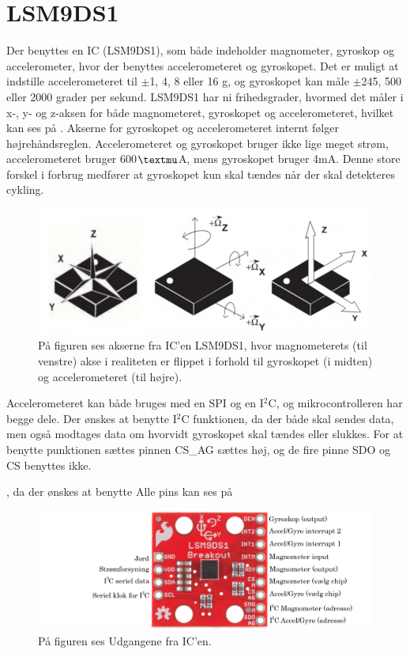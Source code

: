 \section{LSM9DS1}
Der benyttes en IC (LSM9DS1), som både indeholder magnometer, gyroskop og accelerometer, hvor der benyttes accelerometeret og gyroskopet. Det er muligt at indstille accelerometeret til $\pm$1, 4, 8 eller 16 g, og gyroskopet kan måle $\pm$245, 500 eller 2000 grader per sekund.\citep{Jimb02016} \newline
LSM9DS1 har ni frihedsgrader, hvormed det måler i x-, y- og z-aksen for både magnometeret, gyroskopet og accelerometeret, hvilket kan ses på . Akserne for gyroskopet og accelerometeret internt følger højrehåndsreglen.\citep{Jimb02016}\newline
Accelerometeret og gyroskopet bruger ikke lige meget strøm, accelerometeret bruger 600$\textmu$A, mens gyroskopet bruger 4mA. Denne store forskel i forbrug medfører at gyroskopet kun skal tændes når der skal detekteres cykling. 

\begin{figure}[H]
	\centering
	\includegraphics[scale=0.6]{figures/cDesign/LSM9DS1.png}
	\caption{På figuren ses akserne fra IC'en LSM9DS1, hvor magnometerets (til venstre) akse i realiteten er flippet i forhold til gyroskopet (i midten) og accelerometeret (til højre).\citep{Jimb02016}}
	\label{vores_IC}
\end{figure}

Accelerometeret kan både bruges med en SPI og en I$^{2}$C, og mikrocontrolleren har begge dele. Der ønskes at benytte I$^{2}$C funktionen, da der både skal sendes data, men også modtages data om hvorvidt gyroskopet skal tændes eller slukkes. For at benytte punktionen sættes pinnen CS\_AG sættes høj, og de fire pinne SDO og CS benyttes ikke. 

, da der ønskes at benytte  Alle pins kan ses på 

\begin{figure}[H]
	\centering
	\includegraphics[scale=0.35]{figures/cDesign/accelerometeret.png}
	\caption{På figuren ses Udgangene fra IC'en.\citep{Jimb02016}}
	\label{IC_pins}
\end{figure}

